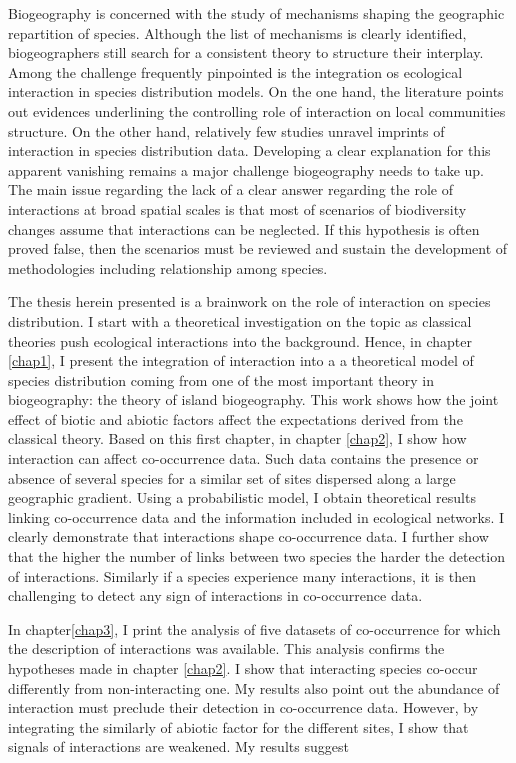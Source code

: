 Biogeography is concerned with the study of mechanisms shaping the
geographic repartition of species. Although the list of mechanisms is
clearly identified, biogeographers still search for a consistent theory
to structure their interplay. Among the challenge frequently pinpointed
is the integration os ecological interaction in species distribution
models. On the one hand, the literature points out evidences underlining
the controlling role of interaction on local communities structure. On
the other hand, relatively few studies unravel imprints of interaction
in species distribution data. Developing a clear explanation for this
apparent vanishing remains a major challenge biogeography needs to take
up. The main issue regarding the lack of a clear answer regarding the
role of interactions at broad spatial scales is that most of scenarios
of biodiversity changes assume that interactions can be neglected. If
this hypothesis is often proved false, then the scenarios must be
reviewed and sustain the development of methodologies including
relationship among species.

The thesis herein presented is a brainwork on the role of interaction on
species distribution. I start with a theoretical investigation on the
topic as classical theories push ecological interactions into the
background. Hence, in chapter \ref{chap1}, I present the integration of
interaction into a a theoretical model of species distribution coming
from one of the most important theory in biogeography: the theory of
island biogeography. This work shows how the joint effect of biotic and
abiotic factors affect the expectations derived from the classical
theory. Based on this first chapter, in chapter \ref{chap2}, I show how
interaction can affect co-occurrence data. Such data contains the
presence or absence of several species for a similar set of sites
dispersed along a large geographic gradient. Using a probabilistic
model, I obtain theoretical results linking co-occurrence data and the
information included in ecological networks. I clearly demonstrate that
interactions shape co-occurrence data. I further show that the higher
the number of links between two species the harder the detection of
interactions. Similarly if a species experience many interactions, it is
then challenging to detect any sign of interactions in co-occurrence
data.

In chapter\ref{chap3}, I print the analysis of five datasets of
co-occurrence for which the description of interactions was available.
This analysis confirms the hypotheses made in chapter \ref{chap2}. I
show that interacting species co-occur differently from non-interacting
one. My results also point out the abundance of interaction must
preclude their detection in co-occurrence data. However, by integrating
the similarly of abiotic factor for the different sites, I show that
signals of interactions are weakened. My results suggest

